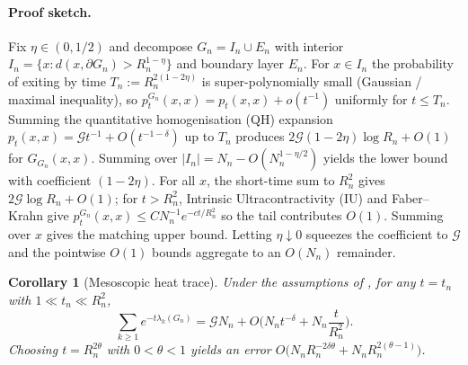 \documentclass{article}
\numberwithin{equation}{section}
\newtheorem{corollary}[theorem]{Corollary}
\theoremstyle{definition}
\theoremstyle{remark}
\newcommand{\cG}{\mathcal{G}}
\begin{document}
\paragraph{Proof sketch.} Fix $\eta\in(0,1/2)$ and decompose $G_n=I_n\cup E_n$ with interior $I_n=\{x: d(x,\partial G_n)>R_n^{1-\eta}\}$ and boundary layer $E_n$. For $x\in I_n$ the probability of exiting by time $T_n:=R_n^{2(1-2\eta)}$ is super-polynomially small (Gaussian / maximal inequality), so $p_t^{G_n}(x,x)=p_t(x,x)+o(t^{-1})$ uniformly for $t\le T_n$. Summing the quantitative homogenisation (QH) expansion $p_t(x,x)=\cG t^{-1}+O(t^{-1-\delta})$ up to $T_n$ produces $2\cG(1-2\eta)\log R_n+O(1)$ for $G_{G_n}(x,x)$. Summing over $|I_n|=N_n-O(N_n^{1-\eta/2})$ yields the lower bound with coefficient $(1-2\eta)$. For all $x$, the short-time sum to $R_n^2$ gives $2\cG\log R_n+O(1)$; for $t>R_n^2$, Intrinsic Ultracontractivity (IU) and Faber--Krahn give $p_t^{G_n}(x,x)\le C N_n^{-1} e^{-c t/R_n^2}$ so the tail contributes $O(1)$. Summing over $x$ gives the matching upper bound. Letting $\eta\downarrow0$ squeezes the coefficient to $\cG$ and the pointwise $O(1)$ bounds aggregate to an $O(N_n)$ remainder.

\begin{corollary}[Mesoscopic heat trace]\label{cor:heat_trace}
Under the assumptions of , for any $t=t_n$ with $1\ll t_n \ll R_n^2$,
\[
  \sum_{k\ge1} e^{-t \lambda_k(G_n)} = \cG N_n + O\Big(N_n t^{-\delta} + N_n \frac{t}{R_n^2}\Big).
\]
Choosing $t=R_n^{2\theta}$ with $0<\theta<1$ yields an error $O\big(N_n R_n^{-2\delta\theta} + N_n R_n^{2(\theta-1)}\big)$.
\end{corollary}
\end{document}
